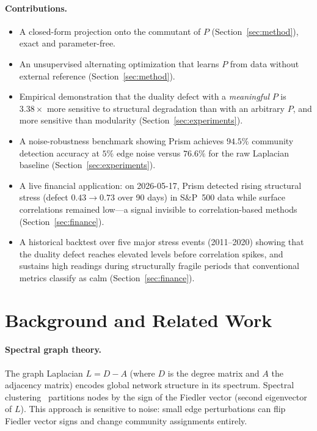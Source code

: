 \documentclass[11pt]{article}
\begin{document}
\paragraph{Contributions.}
\begin{itemize}
  \item A closed-form projection onto the commutant of $P$
        (Section~\ref{sec:method}), exact and parameter-free.
  \item An unsupervised alternating optimization that learns $P$ from
        data without external reference (Section~\ref{sec:method}).
  \item Empirical demonstration that the duality defect with a
        \emph{meaningful} $P$ is $3.38\times$ more sensitive to structural
        degradation than with an arbitrary $P$, and more sensitive than
        modularity (Section~\ref{sec:experiments}).
  \item A noise-robustness benchmark showing Prism achieves $94.5\%$
        community detection accuracy at $5\%$ edge noise versus $76.6\%$
        for the raw Laplacian baseline (Section~\ref{sec:experiments}).
  \item A live financial application: on 2026-05-17, Prism detected rising
        structural stress (defect $0.43 \to 0.73$ over 90 days) in S\&P~500
        data while surface correlations remained low---a signal invisible
        to correlation-based methods (Section~\ref{sec:finance}).
  \item A historical backtest over five major stress events (2011--2020)
        showing that the duality defect reaches elevated levels before
        correlation spikes, and sustains high readings during structurally
        fragile periods that conventional metrics classify as calm
        (Section~\ref{sec:finance}).
\end{itemize}

\section{Background and Related Work}

\paragraph{Spectral graph theory.}
The graph Laplacian $L = D - A$ (where $D$ is the degree matrix and $A$
the adjacency matrix) encodes global network structure in its spectrum.
Spectral clustering~\cite{vonLuxburg2007} partitions nodes by the sign of
the Fiedler vector (second eigenvector of $L$).
This approach is sensitive to noise: small edge perturbations can flip
Fiedler vector signs and change community assignments entirely.
\end{document}
